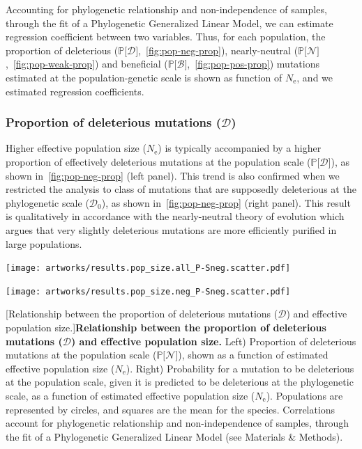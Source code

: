 \documentclass{article}
\newcommand{\Ne}{N_{\text{e}}}
\newcommand{\proba}{\mathbb{P}}
\newcommand{\SphyDel}{\mathcal{D}_0}
\newcommand{\SpopDel}{\mathcal{D}}
\newcommand{\SpopNeu}{\mathcal{N}}
\newcommand{\SpopBen}{\mathcal{B}}
\newcommand{\ProbaPopDel}{\proba{[} \SpopDel]}
\newcommand{\ProbaPopNeu}{\proba{[} \SpopNeu ]}
\newcommand{\ProbaPopBen}{\proba{[} \SpopBen ]}
\begin{document}
    \newpage
    Accounting for phylogenetic relationship and non-independence of samples, through the fit of a Phylogenetic Generalized Linear Model, we can estimate regression coefficient between two variables.
    Thus, for each population, the proportion of deleterious ($\ProbaPopDel$,~\ref{fig:pop-neg-prop}), nearly-neutral ($\ProbaPopNeu$,~\ref{fig:pop-weak-prop}) and beneficial ($\ProbaPopBen$,~\ref{fig:pop-pos-prop}) mutations estimated at the population-genetic scale is shown as function of $\Ne$, and we estimated regression coefficients.


    \subsubsection{Proportion of deleterious mutations (\texorpdfstring{$\SpopDel$}{D})}\label{subsec:proportion-deleterious-mutations}

    Higher effective population size ($\Ne$) is typically accompanied by a higher proportion of effectively deleterious mutations at the population scale ($\proba{[} \SpopDel {]}$), as shown in~\ref{fig:pop-neg-prop} (left panel).
    This trend is also confirmed when we restricted the analysis to class of mutations that are supposedly deleterious at the phylogenetic scale ($\SphyDel$), as shown in~\ref{fig:pop-neg-prop} (right panel).
    This result is qualitatively in accordance with the nearly-neutral theory of evolution which argues that very slightly deleterious mutations are more efficiently purified in large populations.

    \begin{center}
    \begin{minipage}{0.45\linewidth}
        \texttt{[image: artworks/results.pop\_size.all\_P-Sneg.scatter.pdf]}
    \end{minipage}
    \begin{minipage}{0.45\linewidth}
        \texttt{[image: artworks/results.pop\_size.neg\_P-Sneg.scatter.pdf]}
    \end{minipage}
    [Relationship between the proportion of deleterious mutations ($\SpopDel$) and effective population size.]{\textbf{Relationship between the proportion of deleterious mutations ($\bm{\SpopDel}$) and effective population size.}
    Left) Proportion of deleterious mutations at the population scale ($\proba{[} \SpopNeu{]}$), shown as a function of estimated effective population size ($\Ne$). Right) Probability for a mutation to be deleterious at the population scale, given it is predicted to be deleterious at the phylogenetic scale, as a function of estimated effective population size ($\Ne$). Populations are represented by circles, and squares are the mean for the species. Correlations account for phylogenetic relationship and non-independence of samples, through the fit of a Phylogenetic Generalized Linear Model (see Materials \& Methods).\label{fig:pop-neg-prop}}
    \end{center}
\end{document}
